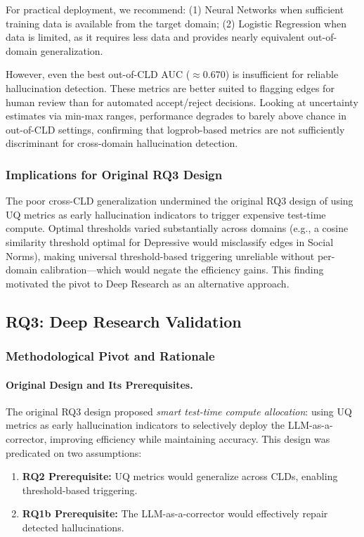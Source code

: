 For practical deployment, we recommend: (1) Neural Networks when sufficient training data is available from the target domain; (2) Logistic Regression when data is limited, as it requires less data and provides nearly equivalent out-of-domain generalization.

However, even the best out-of-CLD AUC ($\approx$0.670) is insufficient for reliable hallucination detection. These metrics are better suited to flagging edges for human review than for automated accept/reject decisions. Looking at uncertainty estimates via min-max ranges, performance degrades to barely above chance in out-of-CLD settings, confirming that logprob-based metrics are not sufficiently discriminant for cross-domain hallucination detection.

\subsubsection{Implications for Original RQ3 Design}

The poor cross-CLD generalization undermined the original RQ3 design of using UQ metrics as early hallucination indicators to trigger expensive test-time compute. Optimal thresholds varied substantially across domains (e.g., a cosine similarity threshold optimal for Depressive would misclassify edges in Social Norms), making universal threshold-based triggering unreliable without per-domain calibration---which would negate the efficiency gains. This finding motivated the pivot to Deep Research as an alternative approach.

\subsection{RQ3: Deep Research Validation}
\label{sec:discussion_rq3}
\label{sec:rq3_pivot}

\subsubsection{Methodological Pivot and Rationale}

\paragraph{Original Design and Its Prerequisites.}
The original RQ3 design proposed \textit{smart test-time compute allocation}: using UQ metrics as early hallucination indicators to selectively deploy the LLM-as-a-corrector, improving efficiency while maintaining accuracy. This design was predicated on two assumptions:
\begin{enumerate}[noitemsep]
    \item \textbf{RQ2 Prerequisite:} UQ metrics would generalize across CLDs, enabling threshold-based triggering.
    \item \textbf{RQ1b Prerequisite:} The LLM-as-a-corrector would effectively repair detected hallucinations.
\end{enumerate}

